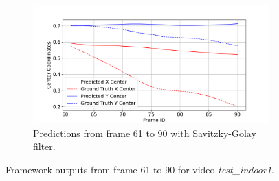 \documentclass[12pt,oneside]{book} %
\begin{document}
\begin{figure}[H]
\begin{subfigure}[t]{0.9\textwidth}
        \includegraphics[width=\textwidth]{figures/framework/test_indoor1 SA Filter - 1.png}
        \caption{Predictions from frame 61 to 90 with Savitzky-Golay filter.}
        \label{fig:framework-test_indoor1-1-sa}
    \end{subfigure}
    \caption{Framework outputs from frame 61 to 90 for video \textit{test\_indoor1}.}
    \label{fig:framework-test_indoor1-1}
\end{figure}
\end{document}
